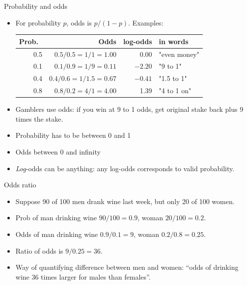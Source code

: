 \documentclass[ignorenonframetext,]{beamer}
\begin{document}
\begin{frame}{Probability and odds}
\protect\hypertarget{probability-and-odds}{}

\begin{itemize}
\item
  For probability \(p\), odds is \(p/(1-p)\). Examples: \vfill

  \begin{tabular}{rrrl}
  \hline
  Prob.\ & Odds & log-odds & in words\\
  \hline
  0.5 & $0.5/0.5=1/1=1.00$ & 0.00 &  "even money"\\
  0.1 & $0.1/0.9=1/9=0.11$ & $-2.20$ & "9 to 1"\\
  0.4 & $0.4/0.6=1/1.5=0.67$ & $-0.41$ & "1.5 to 1"\\
  0.8 & $0.8/0.2=4/1=4.00$ & 1.39 & "4 to 1 on"\\
  \hline
  \end{tabular}
  \vfill
\item
  Gamblers use odds: if you win at 9 to 1 odds, get original stake back
  plus 9 times the stake.
\item
  Probability has to be between 0 and 1
\item
  Odds between 0 and infinity
\item
  \emph{Log}-odds can be anything: any log-odds corresponds to valid
  probability.
\end{itemize}

\end{frame}

\begin{frame}{Odds ratio}
\protect\hypertarget{odds-ratio}{}

\begin{itemize}
\item
  Suppose 90 of 100 men drank wine last week, but only 20 of 100 women.
\item
  Prob of man drinking wine \(90/100=0.9\), woman \(20/100=0.2\).
\item
  Odds of man drinking wine \(0.9/0.1=9\), woman \(0.2/0.8=0.25\).
\item
  Ratio of odds is \(9/0.25=36\).
\item
  Way of quantifying difference between men and women: ``odds of
  drinking wine 36 times larger for males than females''.
\end{itemize}

\end{frame}
\end{document}
